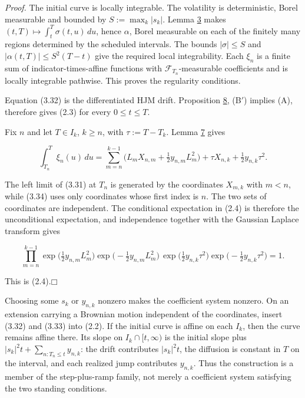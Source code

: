 \documentclass[11pt]{article}
\providecommand{\square}{\mdlgwhtsquare}
\begin{document}
\emph{Proof.} The initial curve is locally integrable. The volatility is deterministic, Borel measurable and bounded by \(S := \max_k |s_k|\). Lemma \hyperref[res:Lemma-3]{3} makes \((t,T) \mapsto \int_t^T \sigma(t,u)\,du\), hence \(\alpha\), Borel measurable on each of the finitely many regions determined by the scheduled intervals. The bounds \(|\sigma| \le S\) and \(|\alpha(t,T)| \le S^2(T-t)\) give the required local integrability. Each \(\xi_n\) is a finite sum of indicator-times-affine functions with \(\mathcal F_{T_n}\)-measurable coefficients and is locally integrable pathwise. This proves the regularity conditions.

Equation (3.32) is the differentiated HJM drift. Proposition \hyperref[res:Proposition-8]{8}, (B\('\)) implies (A), therefore gives (2.3) for every \(0 \le t \le T\).

Fix \(n\) and let \(T \in I_k\), \(k \ge n\), with \(\tau := T-T_k\). Lemma \hyperref[res:Lemma-7]{7} gives

\begin{equation*}
\int_{T_n}^T \xi_n(u)\,du = \sum_{m=n}^{k-1} \bigl(L_m X_{n,m} + \tfrac12 y_{n,m}L_m^2\bigr) + \tau X_{n,k} + \tfrac12 y_{n,k}\tau^2. \tag{3.34}\label{eq:3.34}
\end{equation*}

The left limit of (3.31) at \(T_n\) is generated by the coordinates \(X_{m,k}\) with \(m<n\), while (3.34) uses only coordinates whose first index is \(n\). The two sets of coordinates are independent. The conditional expectation in (2.4) is therefore the unconditional expectation, and independence together with the Gaussian Laplace transform gives

\begin{equation*}
\prod_{m=n}^{k-1} \exp\bigl(\tfrac12 y_{n,m}L_m^2\bigr)\exp\bigl(-\tfrac12 y_{n,m}L_m^2\bigr)\,
\exp\bigl(\tfrac12 y_{n,k}\tau^2\bigr)\exp\bigl(-\tfrac12 y_{n,k}\tau^2\bigr) = 1. \tag{3.35}\label{eq:3.35}
\end{equation*}

This is (2.4).\hfill$\square$

Choosing some \(s_k\) or \(y_{n,k}\) nonzero makes the coefficient system nonzero. On an extension carrying a Brownian motion independent of the coordinates, insert (3.32) and (3.33) into (2.2). If the initial curve is affine on each \(I_k\), then the curve remains affine there. Its slope on \(I_k \cap [t,\infty)\) is the initial slope plus \(|s_k|^2t + \sum_{n:T_n \le t} y_{n,k}\): the drift contributes \(|s_k|^2t\), the diffusion is constant in \(T\) on the interval, and each realized jump contributes \(y_{n,k}\). Thus the construction is a member of the step-plus-ramp family, not merely a coefficient system satisfying the two standing conditions.
\end{document}

